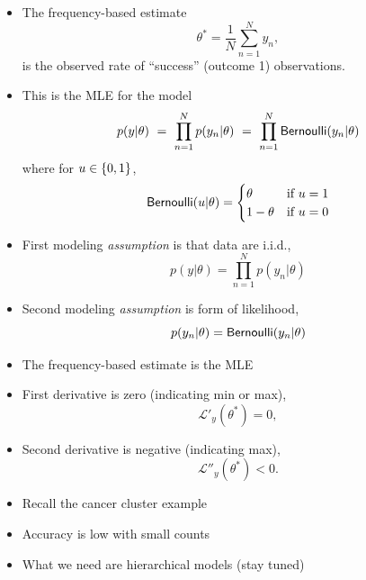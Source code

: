\documentclass[10pt]{report}
\begin{document}
%
\begin{itemize}
\item The frequency-based estimate
\[
\theta^{*} = \frac{1}{N} \sum_{n=1}^N y_n,
\]
is the observed rate of ``success'' (outcome 1) observations.
\item This is the MLE for the model
\[
p(y|\theta)
\ = \ \prod_{n=1}^N p(y_n|\theta)
\ = \  \prod_{n=1}^N \text{\sf Bernoulli}(y_n|\theta)
\]
where for $u \in \{ 0,1 \}$,
{\small
\[
\text{\sf Bernoulli}(u|\theta) =
\begin{cases}
\theta & \text{if } u = 1
\\
1 - \theta & \text{if } u = 0
\end{cases}
\]
}
\end{itemize}


%
\vspace*{-4pt}
\begin{itemize}
\item First modeling \emph{assumption} is that data are i.i.d.,
\[
p(y|\theta) = \prod_{n=1}^N p(y_n|\theta)
\]
\item Second modeling \emph{assumption} is form of likelihood,
\[
p(y_n|\theta) = \text{\sf Bernoulli}(y_n|\theta)
\]
\end{itemize}


%
\begin{itemize}
\item The frequency-based estimate is the MLE
\item First derivative is zero (indicating min or max),
\[
\mathcal{L}'_y(\theta^*) = 0,
\]
\item Second derivative is negative (indicating max),
\[
\mathcal{L}''_y(\theta^*) < 0.
\]
\end{itemize}


%
\begin{itemize}
\item Recall the cancer cluster example
\item Accuracy is low with small counts
\item What we need are hierarchical models (stay tuned)
\end{itemize}


\end{document}
